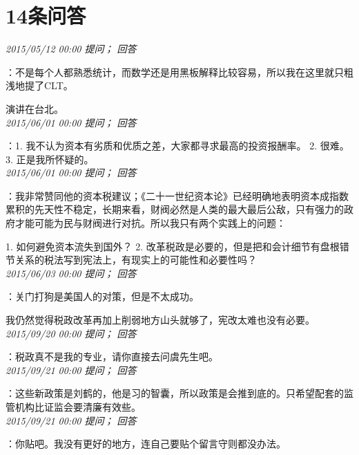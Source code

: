 \documentclass[twocolumn]{ctexart}
\begin{document}
\section{14条问答}

\textit{\hfill\noindent\small 2015/05/12 00:00 提问； 回答}

：不是每个人都熟悉统计，而数学还是用黑板解释比较容易，所以我在这里就只粗浅地提了CLT。

演讲在台北。\\

\textit{\hfill\noindent\small 2015/06/01 00:00 提问； 回答}

：1. 我不认为资本有劣质和优质之差，大家都寻求最高的投资报酬率。
2. 很难。
3. 正是我所怀疑的。\\

\textit{\hfill\noindent\small 2015/06/01 00:00 提问； 回答}

：我非常赞同他的资本税建议；《二十一世纪资本论》已经明确地表明资本成指数累积的先天性不稳定，长期来看，财阀必然是人类的最大最后公敌，只有强力的政府才能可能为民与财阀进行对抗。所以我只有两个实践上的问题：

1. 如何避免资本流失到国外？
2. 改革税政是必要的，但是把和会计细节有盘根错节关系的税法写到宪法上，有现实上的可能性和必要性吗？\\

\textit{\hfill\noindent\small 2015/06/03 00:00 提问； 回答}

：关门打狗是美国人的对策，但是不太成功。

我仍然觉得税政改革再加上削弱地方山头就够了，宪改太难也没有必要。\\

\textit{\hfill\noindent\small 2015/09/20 00:00 提问； 回答}

：税政真不是我的专业，请你直接去问虞先生吧。\\

\textit{\hfill\noindent\small 2015/09/21 00:00 提问； 回答}

：这些新政策是刘鹤的，他是习的智囊，所以政策是会推到底的。只希望配套的监管机构比证监会要清廉有效些。\\

\textit{\hfill\noindent\small 2015/09/21 00:00 提问； 回答}

：你贴吧。我没有更好的地方，连自己要贴个留言守则都没办法。\\
\end{document}
